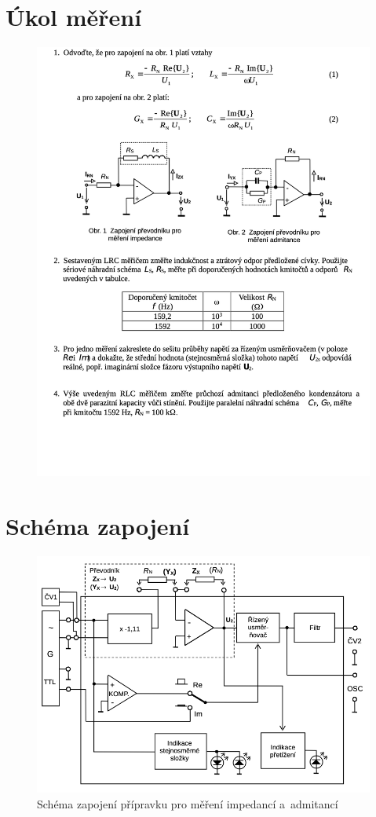 \documentclass[a4paper,12pt]{article}   %
\begin{document}
\section{Úkol měření}
\label{chap:ukol}
\begin{figure}[h!]
  \centering
  \includegraphics[width=\textwidth]{zadani.png}
\end{figure}


\section{Schéma zapojení}
\label{chap:schema_zapojeni}
\begin{figure}[h!]
  \centering
  \includegraphics[width=.5\textwidth]{schema.png}
  \caption{Schéma zapojení přípravku pro měření impedancí a~admitancí}
  \label{fig:schema}
\end{figure}
\end{document}
